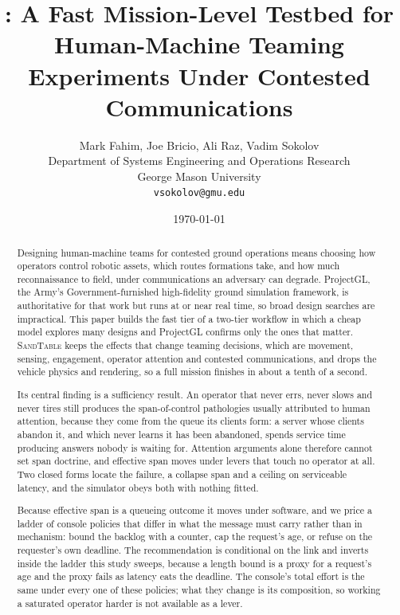 \documentclass[11pt]{article}
\title{\sandtable{}: A Fast Mission-Level Testbed for Human-Machine Teaming Experiments Under Contested Communications}
\author{Mark Fahim, Joe Bricio, Ali Raz, Vadim Sokolov\\
\small Department of Systems Engineering and Operations Research\\[-2pt]
\small George Mason University\\[-2pt]
\small \texttt{vsokolov@gmu.edu}}
\date{\today}
\newcommand{\sandtable}{\textsc{SandTable}}
\begin{document}
\maketitle

\begin{abstract}
Designing human-machine teams for contested ground operations means choosing how operators control
robotic assets, which routes formations take, and how much reconnaissance to field, under
communications an adversary can degrade. ProjectGL, the Army's Government-furnished high-fidelity
ground simulation framework, is authoritative for that work but runs at or near real time, so broad
design searches are impractical. This paper builds the fast tier of a two-tier workflow in which a
cheap model explores many designs and ProjectGL confirms only the ones that matter. \sandtable{}
keeps the effects that change teaming decisions, which are movement, sensing, engagement, operator
attention and contested communications, and drops the vehicle physics and rendering, so a full
mission finishes in about a tenth of a second.

Its central finding is a sufficiency result. An operator that never errs, never slows and never
tires still produces the span-of-control pathologies usually attributed to human attention, because
they come from the queue its clients form: a server whose clients abandon it, and which never learns
it has been abandoned, spends service time producing answers nobody is waiting for. Attention
arguments alone therefore cannot set span doctrine, and effective span moves under levers that touch
no operator at all. Two closed forms locate the failure, a collapse span and a ceiling on serviceable
latency, and the simulator obeys both with nothing fitted.

Because effective span is a queueing outcome it moves under software, and we price a ladder of
console policies that differ in what the message must carry rather than in mechanism: bound the
backlog with a counter, cap the request's age, or refuse on the requester's own deadline. The
recommendation is conditional on the link and inverts inside the ladder this study sweeps, because a
length bound is a proxy for a request's age and the proxy fails as latency eats the deadline. The
console's total effort is the same under every one of these policies; what they change is its
composition, so working a saturated operator harder is not available as a lever.


\end{abstract}
\end{document}

